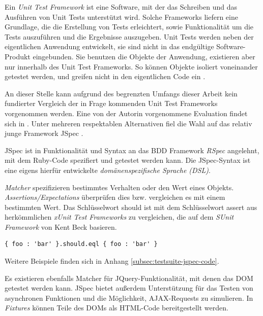 Ein \textit{Unit Test Framework} ist eine Software, mit der das Schreiben und das Ausführen von Unit Tests unterstützt wird. Solche Frameworks liefern eine Grundlage, die die Erstellung von Tests erleichtert, sowie Funktionalität um die Tests auszuführen und die Ergebnisse auszugeben. Unit Tests werden neben der eigentlichen Anwendung entwickelt, sie sind nicht in das endgültige Software-Produkt eingebunden. Sie benutzen die Objekte der Anwendung, existieren aber nur innerhalb des Unit Test Frameworks. So können Objekte isoliert voneinander getestet werden, und greifen nicht in den eigentlichen Code ein .

An dieser Stelle kann aufgrund des begrenzten Umfangs dieser Arbeit kein fundierter Vergleich der in Frage kommenden Unit Test Frameworks vorgenommen werden. Eine von der Autorin vorgenommene Evaluation findet sich in \cite{jspec:evaluation}. Unter mehreren respektablen Alternativen \cite{jspec:unitlist} fiel die Wahl auf das relativ junge Framework JSpec \cite{jspec:website}. 
 

JSpec ist in Funktionalität und Syntax an das BDD Framework \textit{RSpec} \cite{rspec:website} angelehnt, mit dem Ruby-Code spezifiert und getestet werden kann. Die JSpec-Syntax ist eine eigens hierfür entwickelte \textit{domänenspezifische Sprache (DSL)}. 

\textit{Matcher} spezifizieren bestimmtes Verhalten oder den Wert eines Objekts. \textit{Assertions/Expectations} überprüfen dies bzw. vergleichen es mit einem bestimmten Wert. Das Schlüsselwort {\selectfont should} ist mit dem Schlüsselwort {\selectfont assert} aus herkömmlichen \textit{xUnit Test Frameworks} zu vergleichen, die auf dem \textit{SUnit Framework} von Kent Beck basieren. 

\medskip
\begin{lstlisting}[caption=JSpec Beispiel: Der Matcher {\fontfamily{pcr}\selectfont eql}]
{ foo : 'bar' }.should.eql { foo : 'bar' }
\end{lstlisting}

Weitere Beispiele finden sich in Anhang \ref{subsec:testsuite-jspec-code}. 

Es existieren ebenfalls Matcher für JQuery-Funktionalität, mit denen das DOM getestet werden kann. JSpec bietet außerdem Unterstützung für das Testen von asynchronen Funktionen und die Möglichkeit, AJAX-Requests zu simulieren. In \textit{Fixtures} können Teile des DOMs als HTML-Code bereitgestellt werden. 

